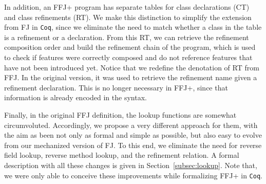 In addition, an \ac{FFJ+} program has separate tables for class 
declarations (\textsf{CT}) and class refinements (\textsf{RT}).
We make this distinction to simplify the extension from \ac{FJ} in \texttt{Coq}, since 
we eliminate the need to match whether a class in the table 
is a refinement or a declaration. From this \textsf{RT}, we can retrieve the 
refinement composition order and build the refinement chain of the program, 
which is used to check if features were correctly composed and
do not reference features that have not been introduced yet. 
Notice that we redefine the denotation of \textsf{RT} from \ac{FFJ}.
In the original version, it was used to retrieve the refinement name given a 
refinement declaration. This is no longer necessary in \ac{FFJ+}, since
that information is already encoded in the syntax.

Finally, in the original \ac{FFJ} definition, the lookup functions are 
somewhat circumvoluted. %
Accordingly, we propose a very different approach
for them, with the aim as been not only as formal and simple as possible, 
but also easy to evolve from our mechanized version of \ac{FJ}. 
To this end, we eliminate the need for reverse field lookup, reverse method lookup, 
and the refinement relation. A formal description with all these changes 
is given in Section~\ref{subsec:lookup}. Note that, we were only 
able to conceive these improvements while formalizing \ac{FFJ+} in 
\texttt{Coq}. 

